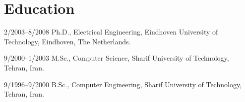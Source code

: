\section{Education}
\begin{CV}
\item[2/2003--8/2008] Ph.D., Electrical Engineering, Eindhoven
University of Technology, Eindhoven, The Netherlands.

\item[9/2000--1/2003] M.Sc., Computer Science, Sharif University of Technology, Tehran, Iran.

\item[9/1996--9/2000] B.Sc., Computer Engineering, Sharif University
of Technology, Tehran, Iran.

\end{CV}